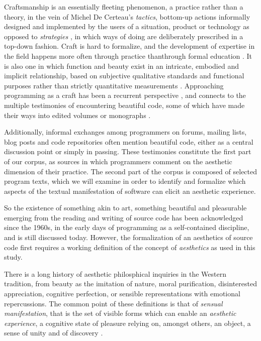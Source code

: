 Craftsmanship is an essentially fleeting phenomenon, a practice rather than a theory, in the vein of Michel De Certeau's \textit{tactics}, bottom-up actions informally designed and implemented by the users of a situation, product or technology as opposed to \textit{strategies} \citep{certeau_invention_1990}, in which ways of doing are deliberately prescribed in a top-down fashion. Craft is hard to formalize, and the development of expertise in the field happens more often through practice thanthrough formal education \citep{sennett_craftsman_2009}. It is also one in which function and beauty exist in an intricate, embodied and implicit relationship, based on subjective qualitative standards and functional purposes rather than strictly quantitative measurements \citep{pye_nature_2008}. Approaching programming as a craft has been a recurrent perspective \citep{levy_programmation_1992,dijkstra_craftsman_1982}, and connects to the multiple testimonies of encountering beautiful code, some of which have made their ways into edited volumes or monographs \citep{oram_beautiful_2007,chandra_geek_2014,gabriel_patterns_1998}.

Additionally, informal exchanges among programmers on forums, mailing lists, blog posts and code repositories often mention beautiful code, either as a central discussion point or simply in passing. These testimonies constitute the first part of our corpus, as sources in which programmers comment on the aesthetic dimension of their practice. The second part of the corpus is composed of selected program texts, which we will examine in order to identify and formalize which aspects of the textual manifestation of software can elicit an aesthetic experience.

So the existence of something akin to art, something beautiful and pleasurable emerging from the reading and writing of source code has been acknowledged since the 1960s, in the early days of programming as a self-contained discipline, and is still discussed today. However, the formalization of an aesthetics of source code first requires a working definition of the concept of \emph{aesthetics} as used in this study.

There is a long history of aesthetic philosphical inquiries in the Western tradition, from beauty as the imitation of nature, moral purification, disinterested appreciation, cognitive perfection, or sensible representations with emotional repercussions. The common point of these definitions is that of \emph{sensual manifestation}, that is the set of visible forms which can enable an \emph{aesthetic experience}, a cognitive state of pleasure relying on, amongst others, an object, a sense of unity and of discovery \citep{beardsley_aesthetic_1970}.

